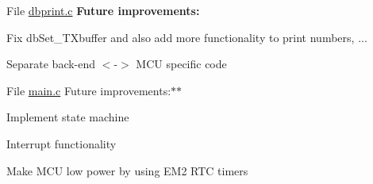 
\begin{DoxyRefList}
\item[File \mbox{\hyperlink{dbprint_8c}{dbprint.c}} ]\label{todo__todo000002}%
%
 {\bfseries{Future improvements\+:}}~\newline

\begin{DoxyItemize}
\item Fix {\ttfamily db\+Set\+\_\+\+T\+Xbuffer} and also add more functionality to print numbers, ...
\item Separate back-\/end $<$-\/$>$ M\+CU specific code 
\end{DoxyItemize}
\item[File \mbox{\hyperlink{main_8c}{main.c}} ]\label{todo__todo000001}%
%
 Future improvements\+:$\ast$$\ast$~\newline

\begin{DoxyItemize}
\item Implement state machine
\item Interrupt functionality
\item Make M\+CU low power by using E\+M2 R\+TC timers
\end{DoxyItemize}
\end{DoxyRefList}
